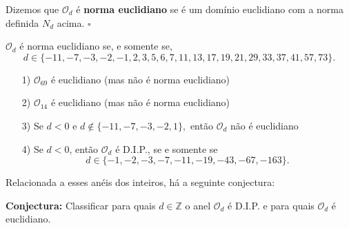 \documentclass[algebraII_notes.tex]{subfiles}
\begin{document}
\begin{def*}
	Dizemos que \(\mathcal{O}_{d}\) é \textbf{norma euclidiano} se é um domínio euclidiano com a norma definida \(N_{d}\) acima. \(\square\)
\end{def*}
\begin{theorem*}
	\(\mathcal{O}_{d}\) é norma euclidiano se, e somente se,
	\[
		d\in\{-11, -7, -3, -2, -1, 2, 3, 5, 6, 7, 11, 13, 17, 19, 21, 29, 33, 37, 41, 57, 73\}.
	\]
\end{theorem*}
\begin{theorem*}
	\begin{itemize}
		\item[1)] \(\mathcal{O}_{69}\) é euclidiano (mas não é norma euclidiano)
		\item[2)] \(\mathcal{O}_{14}\) é euclidiano (mas não é norma euclidiano)
		\item[3)] Se \(d < 0\) e \(d\not\in\{-11, -7, -3, -2, 1\},\) então \(\mathcal{O}_{d}\) não é euclidiano
		\item[4)] Se \(d < 0\), então \(\mathcal{O}_{d}\) é D.I.P., se e somente se
		      \[
			      d\in\{-1, -2, -3, -7, -11, -19, -43, -67, -163\}.
		      \]
	\end{itemize}
\end{theorem*}
Relacionada a esses anéis dos inteiros, há a seguinte conjectura:

\textbf{Conjectura:} Classificar para quais \(d\in \mathbb{Z}\) o anel \(\mathcal{O}_{d}\) é D.I.P. e para quais
\(\mathcal{O}_{d}\) é euclidiano.
\end{document}
